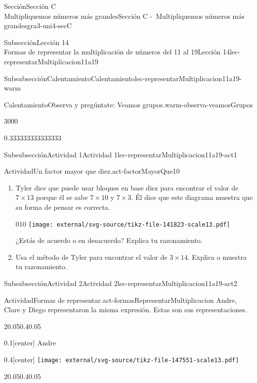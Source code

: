 \begin{sectionptx}{Sección}{{\Large Sección C\\}Multipliquemos números más grandes}{}{Sección C -~Multipliquemos números más grandes}{}{}{gra3-uni4-secC}
\begin{subsectionptx}{Subsección}{{\normalsize Lección 14\\[-0.05cm]}Formas de representar la multiplicación de números del 11 al 19}{}{Lección 14}{}{}{lec-representarMultiplicacion11a19}
\begin{subsubsectionptx}{Subsubsección}{Calentamiento}{}{Calentamiento}{}{}{lec-representarMultiplicacion11a19-warm}
\begin{exploration}{Calentamiento}{Observa y pregúntate: Veamos grupos.}{warm-observa-veamosGrupos}
\begin{sidebyside}{3}{0}{0}{0}
\begin{sbspanel}{0.333333333333333}
\end{sbspanel}%
\end{sidebyside}%
\end{exploration}%
\end{subsubsectionptx}
%
%
\typeout{************************************************}
\typeout{************************************************}
%
\begin{subsubsectionptx}{Subsubsección}{Actividad 1}{}{Actividad 1}{}{}{lec-representarMultiplicacion11a19-act1}
\begin{activity}{Actividad}{Un factor mayor que diez.}{act-factorMayorQue10}%
%
\begin{enumerate}
\item{}Tyler dice que puede usar bloques en base diez para encontrar el valor de \(7\times 13\) porque él se sabe \(7\times 10\) y \(7\times 3\). Él dice que este diagrama muestra que su forma de pensar es correcta.%
\begin{image}{0}{1}{0}{}%
\texttt{[image: external/svg-source/tikz-file-141823-scale13.pdf]}
\end{image}%
¿Estás de acuerdo o en desacuerdo? Explica tu razonamiento.%
\item{}Usa el método de Tyler para encontrar el valor de  \(3\times 14\). Explica o muestra tu razonamiento.%
\end{enumerate}
\end{activity}%
\end{subsubsectionptx}
%
%
\typeout{************************************************}
\typeout{************************************************}
%
\begin{subsubsectionptx}{Subsubsección}{Actividad 2}{}{Actividad 2}{}{}{lec-representarMultiplicacion11a19-act2}
\begin{activity}{Actividad}{Formas de representar.}{act-formasRepresentarMultiplicacion}%
Andre, Clare y Diego representaron la misma expresión. Estas son sus representaciones.%
\begin{sidebyside}{2}{0.05}{0.4}{0.05}%
\begin{sbspanel}{0.1}[center]%
Andre%
\end{sbspanel}%
\begin{sbspanel}{0.4}[center]%
\texttt{[image: external/svg-source/tikz-file-147551-scale13.pdf]}
\end{sbspanel}%
\end{sidebyside}%
\begin{sidebyside}{2}{0.05}{0.4}{0.05}%

\end{sidebyside}
\end{activity}
\end{subsubsectionptx}
\end{subsectionptx}
\end{sectionptx}
